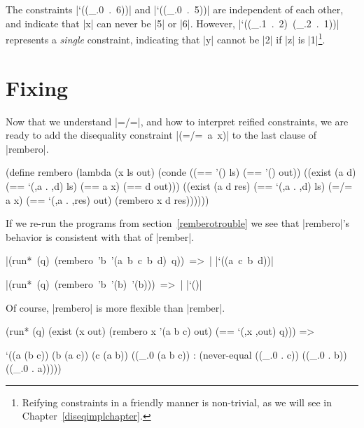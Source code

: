 \noindent The constraints \mbox{\scheme|`((_.0 . 6))|} and
\mbox{\scheme|`((_.0 . 5))|} are independent of each other, and
indicate that \mbox{\scheme|x|} can never be \mbox{\scheme|5|} or
\mbox{\scheme|6|}. However, \mbox{\scheme|`((_.1 . 2) (_.2 . 1))|}
represents a \emph{single} constraint, indicating that
\mbox{\scheme|y|} cannot be \mbox{\scheme|2|} if \mbox{\scheme|z|} is
\mbox{\scheme|1|}\footnote{Reifying constraints in a friendly manner
  is non-trivial, as we will see in Chapter~\ref{diseqimplchapter}.}.

\section{Fixing {\remberosymbol}}\label{fixingrembero}
\enlargethispage{2em}


Now that we understand \mbox{\scheme|=/=|}, and how to interpret reified constraints,
we are ready to add the disequality constraint \mbox{\scheme|(=/= a x)|} to the last
clause of \mbox{\scheme|rembero|}.

\schemedisplayspace
\begin{schemedisplay}
(define rembero
  (lambda (x ls out)
    (conde
      ((== '() ls) (== '() out))
      ((exist (a d)
         (== `(,a . ,d) ls)
         (== a x)
         (== d out)))
      ((exist (a d res)
         (== `(,a . ,d) ls)
         (=/= a x)
         (== `(,a . ,res) out)
         (rembero x d res))))))
\end{schemedisplay}

If we re-run the programs from section~\ref{remberotrouble} we see
that \mbox{\scheme|rembero|}'s behavior is consistent with that of \mbox{\scheme|rember|}.

\wspace

\noindent\mbox{\scheme|(run* (q) (rembero 'b '(a b c b d) q)) => |} \mbox{\schemeresult|`((a c b d))|}

\wspace

\noindent\mbox{\scheme|(run* (q) (rembero 'b '(b) '(b))) => |} \mbox{\schemeresult|`()|}

\wspace

Of course, \mbox{\scheme|rembero|} is more flexible than \mbox{\scheme|rember|}.

\schemedisplayspace
\begin{schemedisplay}
(run* (q)
  (exist (x out)
    (rembero x '(a b c) out)
    (== `(,x ,out) q))) =>
\end{schemedisplay}
\nspace
\begin{schemeresponse}
`((a (b c))
  (b (a c))
  (c (a b))
  ((_.0 (a b c)) : (never-equal ((_.0 . c)) ((_.0 . b)) ((_.0 . a)))))
\end{schemeresponse}


